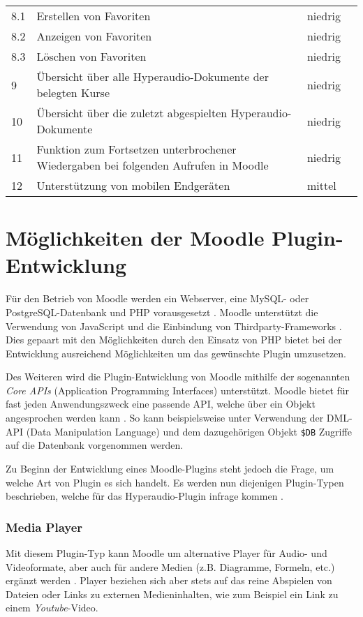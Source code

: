 \begin{table}[!ht]
\begin{tabularx}{\textwidth}{lXll}
    8.1 & \hspace*{0.5cm} Erstellen von Favoriten & niedrig\\
    8.2 & \hspace*{0.5cm} Anzeigen von Favoriten & niedrig\\
    8.3 & \hspace*{0.5cm} Löschen von Favoriten & niedrig\\    
    9 & Übersicht über alle Hyperaudio-Dokumente der belegten Kurse & niedrig\\
    10 & Übersicht über die zuletzt abgespielten Hyperaudio-Dokumente & niedrig\\
    11 &  Funktion zum Fortsetzen unterbrochener Wiedergaben bei folgenden Aufrufen in Moodle & niedrig\\
    12 & Unterstützung von mobilen Endgeräten & mittel\\
    \hline
\end{tabularx}
\end{table}

\section{Möglichkeiten der Moodle Plugin-Entwicklung}
Für den Betrieb von Moodle werden ein Webserver, eine MySQL- oder PostgreSQL-Datenbank und PHP vorausgesetzt . Moodle unterstützt die Verwendung von JavaScript und die Einbindung von Thirdparty-Frameworks \citep{wild2017moodle}. Dies gepaart mit den Möglichkeiten durch den Einsatz von PHP bietet bei der Entwicklung ausreichend Möglichkeiten um das gewünschte Plugin umzusetzen.

Des Weiteren wird die Plugin-Entwicklung von Moodle mithilfe der sogenannten \textit{Core APIs} (Application Programming Interfaces) unterstützt. Moodle bietet für fast jeden Anwendungszweck eine passende API, welche über ein Objekt angesprochen werden kann \citep{wild2017moodle}. So kann beispielsweise unter Verwendung der DML-API (Data Manipulation Language) und dem dazugehörigen Objekt \texttt{\$DB} Zugriffe auf die Datenbank vorgenommen werden.

Zu Beginn der Entwicklung eines Moodle-Plugins steht jedoch die Frage, um welche Art von Plugin es sich handelt. Es werden nun diejenigen Plugin-Typen beschrieben, welche für das Hyperaudio-Plugin infrage kommen \citep{moodle2017plugin}.


\subsubsection{Media Player}
Mit diesem Plugin-Typ kann Moodle um alternative Player für Audio- und Videoformate, aber auch für andere Medien (z.B. Diagramme, Formeln, etc.) ergänzt werden \citep{moodle2017media}. Player beziehen sich aber stets auf das reine Abspielen von Dateien oder Links zu externen Medieninhalten, wie zum Beispiel ein Link zu einem \textit{Youtube}-Video.


